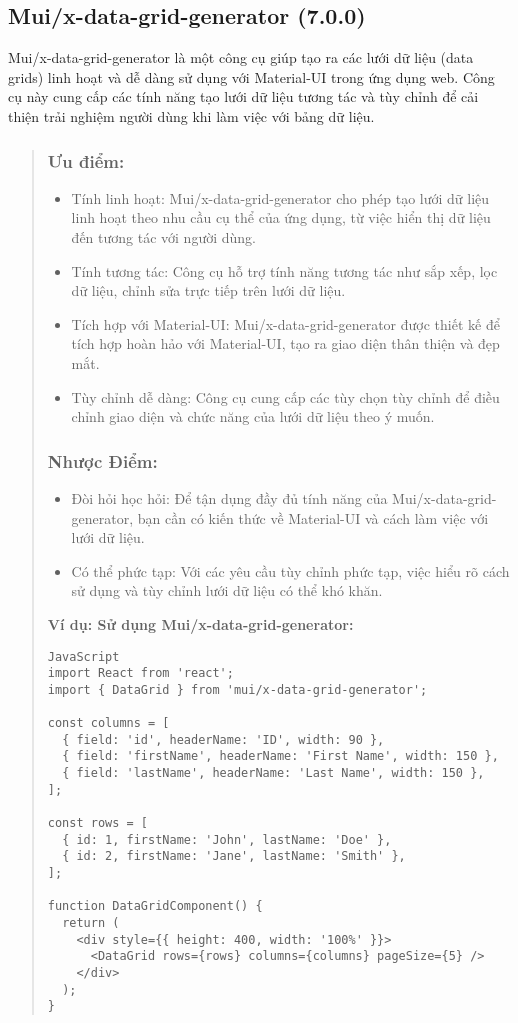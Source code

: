 \subsection{Mui/x-data-grid-generator (7.0.0)}

Mui/x-data-grid-generator là một công cụ giúp tạo ra các lưới dữ liệu (data grids) linh hoạt và dễ dàng sử dụng với Material-UI trong ứng dụng web. Công cụ này cung cấp các tính năng tạo lưới dữ liệu tương tác và tùy chỉnh để cải thiện trải nghiệm người dùng khi làm việc với bảng dữ liệu.

\begin{quote}
\subsubsection{Ưu điểm:}
\begin{itemize}
  \item Tính linh hoạt: Mui/x-data-grid-generator cho phép tạo lưới dữ liệu linh hoạt theo nhu cầu cụ thể của ứng dụng, từ việc hiển thị dữ liệu đến tương tác với người dùng.
  \item Tính tương tác: Công cụ hỗ trợ tính năng tương tác như sắp xếp, lọc dữ liệu, chỉnh sửa trực tiếp trên lưới dữ liệu.
  \item Tích hợp với Material-UI: Mui/x-data-grid-generator được thiết kế để tích hợp hoàn hảo với Material-UI, tạo ra giao diện thân thiện và đẹp mắt.
  \item Tùy chỉnh dễ dàng: Công cụ cung cấp các tùy chọn tùy chỉnh để điều chỉnh giao diện và chức năng của lưới dữ liệu theo ý muốn.
\end{itemize}

\subsubsection{Nhược Điểm:}
\begin{itemize}
  \item Đòi hỏi học hỏi: Để tận dụng đầy đủ tính năng của Mui/x-data-grid-generator, bạn cần có kiến thức về Material-UI và cách làm việc với lưới dữ liệu.
  \item Có thể phức tạp: Với các yêu cầu tùy chỉnh phức tạp, việc hiểu rõ cách sử dụng và tùy chỉnh lưới dữ liệu có thể khó khăn.
\end{itemize}

\textbf{Ví dụ: Sử dụng Mui/x-data-grid-generator:}
\begin{lstlisting}
JavaScript
import React from 'react';
import { DataGrid } from 'mui/x-data-grid-generator';

const columns = [
  { field: 'id', headerName: 'ID', width: 90 },
  { field: 'firstName', headerName: 'First Name', width: 150 },
  { field: 'lastName', headerName: 'Last Name', width: 150 },
];

const rows = [
  { id: 1, firstName: 'John', lastName: 'Doe' },
  { id: 2, firstName: 'Jane', lastName: 'Smith' },
];

function DataGridComponent() {
  return (
    <div style={{ height: 400, width: '100%' }}>
      <DataGrid rows={rows} columns={columns} pageSize={5} />
    </div>
  );
}
\end{lstlisting}
\end{quote}
